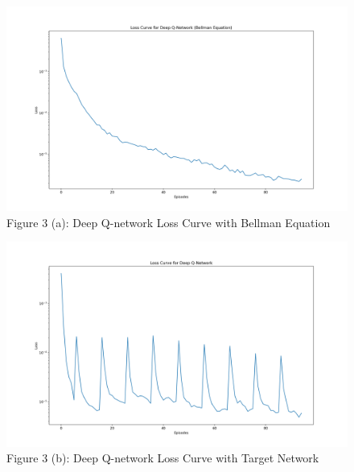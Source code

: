 \documentclass[12pt]{article}
\begin{document}
\clearpage
\begin{figure}
    \centering
    \includegraphics[width=15cm]{figures/3a.png}
    \caption*{Figure 3 (a): Deep Q-network Loss Curve with Bellman Equation}
\end{figure}
\begin{figure}
    \centering
    \includegraphics[width=15cm]{figures/3b.png}
    \caption*{Figure 3 (b): Deep Q-network Loss Curve with Target Network}
\end{figure}
\end{document}
